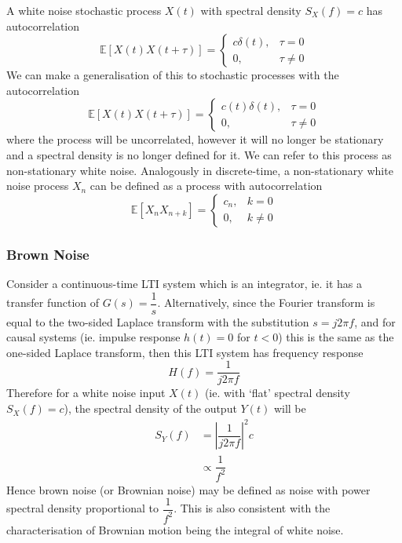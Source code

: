 \documentclass[11pt]{report} %
\begin{document}
A white noise stochastic process $X\left(t\right)$ with spectral density $S_{X}\left(f\right) = c$ has autocorrelation
\begin{equation}
\mathbb{E}\left[X\left(t\right)X\left(t + \tau\right)\right] = \begin{cases} c\delta\left(t\right), & \tau = 0 \\ 0, & \tau \neq 0 \end{cases}
\end{equation}
We can make a generalisation of this to stochastic processes with the autocorrelation
\begin{equation}
\mathbb{E}\left[X\left(t\right)X\left(t + \tau\right)\right] = \begin{cases} c\left(t\right)\delta\left(t\right), & \tau = 0 \\ 0, & \tau \neq 0 \end{cases}
\end{equation}
where the process will be uncorrelated, however it will no longer be stationary and a spectral density is no longer defined for it. We can refer to this process as non-stationary white noise. Analogously in discrete-time, a non-stationary white noise process $X_{n}$ can be defined as a process with autocorrelation
\begin{equation}
\mathbb{E}\left[X_{n}X_{n + k}\right] = \begin{cases} c_{n}, & k = 0 \\ 0, & k \neq 0 \end{cases}
\end{equation}

\subsubsection{Brown Noise}

Consider a continuous-time LTI system which is an integrator, ie. it has a transfer function of $G\left(s\right) = \dfrac{1}{s}$. Alternatively, since the Fourier transform is equal to the two-sided Laplace transform with the substitution $s = j2\pi f$, and for causal systems (ie. impulse response $h\left(t\right) = 0$ for $t < 0$) this is the same as the one-sided Laplace transform, then this LTI system has frequency response
\begin{equation}
H\left(f\right) = \dfrac{1}{j2\pi f}
\end{equation}
Therefore for a white noise input $X\left(t\right)$ (ie. with `flat' spectral density $S_{X}\left(f\right) = c$), the spectral density of the output $Y\left(t\right)$ will be
\begin{align}
S_{Y}\left(f\right) &= \left|\dfrac{1}{j2\pi f}\right|^{2}c \\
&\propto \dfrac{1}{f^{2}}
\end{align}
Hence brown noise (or Brownian noise) may be defined as noise with power spectral density proportional to $\dfrac{1}{f^{2}}$. This is also consistent with the characterisation of Brownian motion being the integral of white noise.
\end{document}
